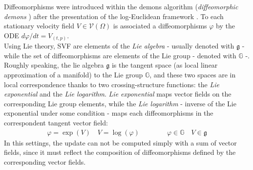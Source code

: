 Diffeomorphisms were introduced within the demons algorithm (\emph{diffeomorphic demons} \cite{vercauteren2006robust}) after the presentation of the log-Euclidean framework \cite{Arsigny:MRM:06}. 
To each stationary velocity field $V \in \mathcal{V}(\Omega)$ is associated a diffeomorphisms $\varphi$ by the ODE $d\varphi /dt = V_{(t,p)} $.\\
Using Lie theory, SVF are elements of the \emph{Lie algebra} - usually denoted with $\mathfrak{g}$ - while the set of diffeomorphisms are elements of the Lie group - denoted with $\mathbb{G}$ -.\\
Roughly speaking, the lie algebra $\mathfrak{g}$ is the tangent space (as local linear approximation of a manifold) to the Lie group $\mathbb{G}$, and these two spaces are in local correspondence thanks to two crossing-structure functions: the \emph{Lie exponential} and the \emph{Lie logarithm}. \emph{Lie exponential} maps vector fields on the corresponding Lie group elements, while the \emph{Lie logarithm} - inverse of the Lie exponential under some condition \cite{lee2012introduction}- maps each diffeomorphisms in the correspondent tangent vector field:
\begin{align*}
\varphi = \exp(V)  
\quad
V = \log(\varphi ) 
\qquad \qquad
\varphi  \in \mathbb{G}
\quad
V \in \mathfrak{g}
\end{align*}
In this settings, the update can not be computed simply with a sum of vector fields, since it must reflect the composition of diffeomorphisms defined by the corresponding vector fields.\\


